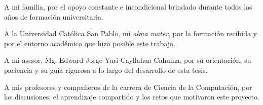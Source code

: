 \begin{agradecimientos}
A mi familia, por el apoyo constante e incondicional brindado durante todos los años de formación universitaria.

A la Universidad Católica San Pablo, mi \textit{alma mater}, por la formación recibida y por el entorno académico que hizo posible este trabajo.

A mi asesor, Mg. Edward Jorge Yuri Cayllahua Cahuina, por su orientación, su paciencia y su guía rigurosa a lo largo del desarrollo de esta tesis.

A mis profesores y compañeros de la carrera de Ciencia de la Computación, por las discusiones, el aprendizaje compartido y los retos que motivaron este proyecto.
\end{agradecimientos}
